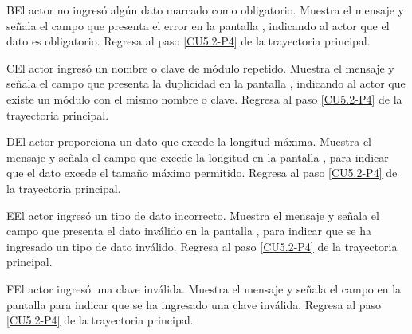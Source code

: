 	\begin{UCtrayectoriaA}{B}{El actor no ingresó algún dato marcado como obligatorio.}
		\UCpaso[\UCsist] Muestra el mensaje  y señala el campo que presenta el error en la pantalla , indicando al actor que el dato es obligatorio.
		\UCpaso Regresa al paso \ref{CU5.2-P4} de la trayectoria principal.
	\end{UCtrayectoriaA}
	
	\begin{UCtrayectoriaA}{C}{El actor ingresó un nombre o clave de módulo repetido.}
		\UCpaso[\UCsist] Muestra el mensaje  y señala el campo que presenta la duplicidad en la pantalla , indicando al actor que existe un módulo con el mismo nombre o clave.
		\UCpaso Regresa al paso \ref{CU5.2-P4} de la trayectoria principal.
	\end{UCtrayectoriaA}

	\begin{UCtrayectoriaA}{D}{El actor proporciona un dato que excede la longitud máxima.}
		\UCpaso[\UCsist] Muestra el mensaje  y señala el campo que excede la longitud en la pantalla , para indicar que el dato excede el tamaño máximo permitido.
		\UCpaso Regresa al paso \ref{CU5.2-P4} de la trayectoria principal.
	\end{UCtrayectoriaA}

	\begin{UCtrayectoriaA}{E}{El actor ingresó un tipo de dato incorrecto.}
		\UCpaso[\UCsist] Muestra el mensaje  y señala el campo que presenta el dato inválido en la pantalla , para indicar que se ha ingresado un tipo de dato inválido.
		\UCpaso Regresa al paso \ref{CU5.2-P4} de la trayectoria principal.
	\end{UCtrayectoriaA}

	\begin{UCtrayectoriaA}{F}{El actor ingresó una clave inválida.}
		\UCpaso[\UCsist] Muestra el mensaje  y señala el campo en la pantalla  para indicar que se ha ingresado una clave inválida.
		\UCpaso Regresa al paso \ref{CU5.2-P4} de la trayectoria principal.
	\end{UCtrayectoriaA}

